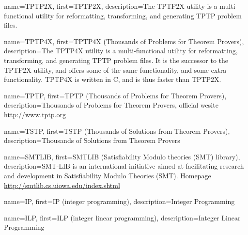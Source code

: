  {
    name=TPTP2X,
    first={TPTP2X},
    description={The TPTP2X utility is a multi-functional utility for reformatting, transforming, and generating TPTP problem files.}
}

 {
    name=TPTP4X,
    first={TPTP4X (Thousands of Problems for Theorem Provers)},
    description={The TPTP4X utility is a multi-functional utility for reformatting, transforming, and generating TPTP problem files. It is the successor to the TPTP2X utility, and offers some of the same functionality, and some extra functionality. TPTP4X is written in C, and is thus faster than TPTP2X.}
}

 {
    name=TPTP,
    first={TPTP (Thousands of Problems for Theorem Provers)},
    description={Thousands of Problems for Theorem Provers, official wesite \url{http://www.tptp.org}}
}

 {
    name=TSTP,
    first={TSTP (Thousands of Solutions from Theorem Provers)},
    description={Thousands of Solutions from Theorem Provers}
}

 {
    name=SMTLIB,
    first={SMTLIB (Satisfiability Modulo theories (SMT) library)},
    description={SMT-LIB is an international initiative aimed at facilitating research and development in Satisfiability Modulo Theories (SMT). Homepage \url{http://smtlib.cs.uiowa.edu/index.shtml}}
}

 {
    name=IP,
    first={IP (integer programming)},
    description={Integer Programming}
}

 {
    name=ILP,
    first={ILP (integer linear programming)},
    description={Integer Linear Programming}
}
